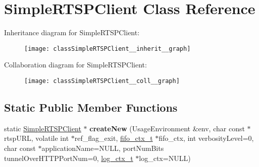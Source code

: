 \hypertarget{classSimpleRTSPClient}{}\section{Simple\+R\+T\+S\+P\+Client Class Reference}
\label{classSimpleRTSPClient}


Inheritance diagram for Simple\+R\+T\+S\+P\+Client\+:\nopagebreak
\begin{figure}[H]
\begin{center}
\leavevmode
\texttt{[image: classSimpleRTSPClient\_\_inherit\_\_graph]}
\end{center}
\end{figure}


Collaboration diagram for Simple\+R\+T\+S\+P\+Client\+:\nopagebreak
\begin{figure}[H]
\begin{center}
\leavevmode
\texttt{[image: classSimpleRTSPClient\_\_coll\_\_graph]}
\end{center}
\end{figure}
\subsection*{Static Public Member Functions}
\begin{DoxyCompactItemize}
\item 
static \hyperlink{classSimpleRTSPClient}{Simple\+R\+T\+S\+P\+Client} $\ast$ {\bfseries create\+New} (Usage\+Environment \&env, char const $\ast$rtsp\+U\+RL, volatile int $\ast$ref\+\_\+flag\+\_\+exit, \hyperlink{fifo_8c_acf3f21e64cbabccd8420c306740820c1}{fifo\+\_\+ctx\+\_\+t} $\ast$fifo\+\_\+ctx, int verbosity\+Level=0, char const $\ast$application\+Name=N\+U\+LL, port\+Num\+Bits tunnel\+Over\+H\+T\+T\+P\+Port\+Num=0, \hyperlink{structlog__ctx__s}{log\+\_\+ctx\+\_\+t} $\ast$log\+\_\+ctx=N\+U\+LL)\hypertarget{classSimpleRTSPClient_a8568e983f40d2992964ca3875b79b643}{}\label{classSimpleRTSPClient_a8568e983f40d2992964ca3875b79b643}

\end{DoxyCompactItemize}
